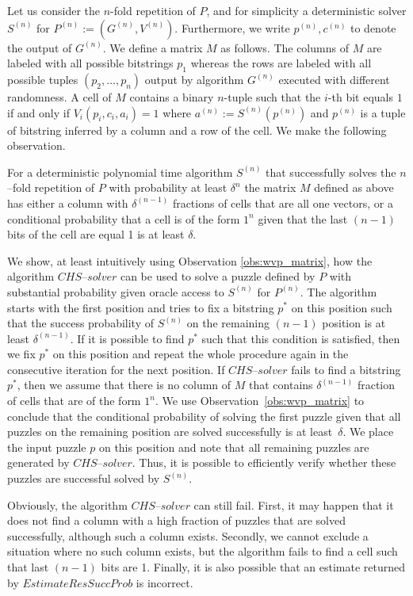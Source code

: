 Let us consider the $n$-fold repetition of $P$, and for simplicity a deterministic solver $S^{(n)}$ for $P^{(n)} := (G^{(n)}, V^{(n)})$.
Furthermore, we write $p^{(n)}, c^{(n)}$ to denote the output of $G^{(n)}$.
We define a matrix $M$ as follows. The columns of $M$ are labeled with all possible bitstrings $p_1$
whereas the rows are labeled with all possible tuples $(p_2, \dotsc, p_n)$ output by algorithm $G^{(n)}$
executed with different randomness.
A cell of $M$ contains a binary $n$-tuple such that the $i$-th bit equals $1$ if and only if $V_i(p_i, c_i, a_i) = 1$ where
 $a^{(n)} := S^{(n)}(p^{(n)})$ and $p^{(n)}$ is a tuple of bitstring inferred by a column and a row of the cell.
We make the following observation.
%
\begin{observation}
\label{obs:wvp_matrix}
For a deterministic polynomial time algorithm $S^{(n)}$ that successfully solves the $n$--fold repetition of $P$ with probability at least $\delta^{n}$
the matrix $M$ defined as above has either a column with $\delta^{(n-1)}$ fractions of cells that are all one vectors, or
a conditional probability that a cell is of the form $1^n$ given that the last $(n-1)$ bits of the cell are equal 1 is at least $\delta$.
\end{observation}
%
We show, at least intuitively using Observation \ref{obs:wvp_matrix}, how the algorithm $\mathit{CHS\text{--}solver}$ can be used to solve a puzzle defined by $P$
with substantial probability given oracle access to $S^{(n)}$ for $P^{(n)}$.
The algorithm starts with the first position and tries to fix a bitstring $p^*$ on this position such that the success probability of $S^{(n)}$ on the remaining $(n-1)$
position is at least $\delta^{(n-1)}$. If it is possible to find $p^*$ such that this condition is satisfied, then we fix $p^*$
on this position and repeat the whole procedure again in the consecutive iteration for the next position.
If $\mathit{CHS\text{--}solver}$ fails to find a bitstring $p^*$, then we assume that there is no column of $M$ that contains $\delta^{(n-1)}$ fraction
of cells that are of the form $1^n$. We use Observation~\ref{obs:wvp_matrix} to conclude that the conditional probability of
solving the first puzzle given that all puzzles on the remaining position are solved successfully is at least~$\delta$.
We place the input puzzle $p$ on this position and note that all remaining puzzles are generated by $\mathit{CHS\text{--}solver}$.
Thus, it is possible to efficiently verify whether these puzzles are successful solved by $S^{(n)}$.

Obviously, the algorithm $\mathit{CHS\text{--}solver}$ can still fail. First, it may happen that it does not find a column
with a high fraction of puzzles that are solved successfully, although such a column exists.
Secondly, we cannot exclude a situation where no such column exists, but the algorithm fails to find a cell such that last $(n\!-\!1)$ bits are 1.
Finally, it is also possible that an estimate returned by $\mathit{EstimateResSuccProb}$ is incorrect.

